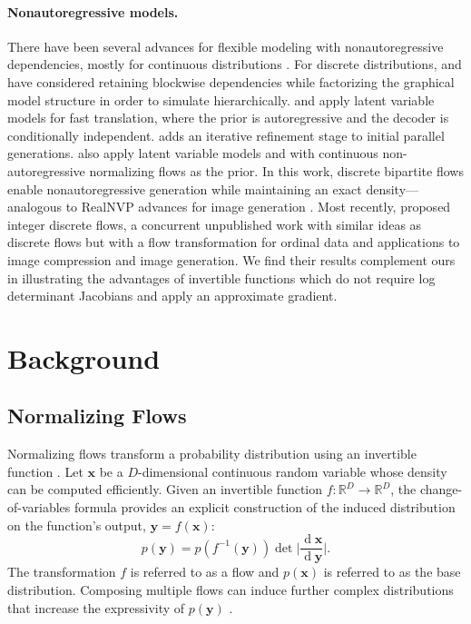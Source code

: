\documentclass{article}
\newcommand{\mathbold}[1]{\ensuremath{\boldsymbol{\mathbf{#1}}}}
\newcommand{\nestedmathbold}[1]{{\mathbold{#1}}}
\newcommand{\mbx}{\nestedmathbold{x}}
\newcommand{\mby}{\nestedmathbold{y}}
\begin{document}
\paragraph{Nonautoregressive models.}
There have been several advances for flexible modeling with nonautoregressive dependencies, mostly for continuous distributions \citep{dinh2014nice,dinh2017density,kingma2018glow}. For discrete distributions, \citet{reed2017parallel} and \citet{stern2018blockwise} have considered retaining blockwise dependencies while factorizing the graphical model structure in order to simulate hierarchically. \citet{gu2018non} and \citet{kaiser2018fast} apply latent variable models for fast translation, where the prior is autoregressive and the decoder is conditionally independent. \citet{lee2018deterministic} adds an iterative refinement stage to initial parallel generations.
\citet{ziegler2019latent} also apply latent variable models and with continuous non-autoregressive normalizing flows as the prior.
In this work, discrete bipartite flows enable nonautoregressive generation while maintaining an exact density---analogous to RealNVP advances for image generation \citep{dinh2017density}.
Most recently, \citet{hoogeboom2019integer} proposed integer discrete flows, a concurrent unpublished work with similar ideas as discrete flows but with a flow transformation for ordinal data and applications to image compression and image generation. We find their results complement ours in illustrating the advantages of invertible functions which do not require log determinant Jacobians and apply an approximate gradient.


\vspace{-1ex}
\section{Background}
\label{sec:background}

\subsection{Normalizing Flows}

Normalizing flows transform a probability distribution using an invertible function
\citep{tabak2013family,rezende2015variational,rippel2013high}. Let $\mbx$ be a $D$-dimensional continuous random variable whose density can be computed efficiently. Given an invertible function $f: \mathbb{R}^D \to \mathbb{R}^D$, the change-of-variables formula provides an explicit construction of the induced distribution on the function's output, $\mby = f(\mbx)$:
\begin{equation}\label{eq:change-of-variables}
    p(\mby) = p(f^{-1}(\mby)) \det \bigg| \frac{\operatorname{d}\mbx}{\operatorname{d}\mby} \bigg|.
\end{equation}
The transformation $f$ is referred to as a flow and $p(\mbx)$ is referred to as the base distribution. Composing multiple flows can induce further complex distributions that increase the expressivity of $p(\mby)$ \citep{rezende2015variational, papamakarios2017masked}.
\end{document}
